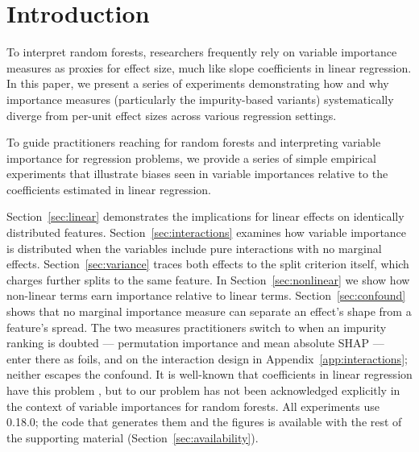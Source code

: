 \section{Introduction}
\label{sec:background-strands}

To interpret random forests, researchers frequently rely on variable
importance measures as proxies for effect size, much like slope
coefficients in linear regression.
In this paper, we present a series of experiments demonstrating
how and why importance measures (particularly the impurity-based variants)
systematically diverge from per-unit
effect sizes across various regression settings.

To guide practitioners reaching for
random forests and interpreting variable importance for regression
problems, we provide a series of simple empirical experiments that
illustrate biases seen in variable importances 
relative to the coefficients estimated in linear regression.

Section~\ref{sec:linear} demonstrates the implications for linear effects on
identically distributed
features. Section~\ref{sec:interactions} examines how variable importance is
distributed
when the variables include pure interactions with no marginal effects.
Section~\ref{sec:variance} traces both effects to the split criterion itself,
which charges further splits to the same feature.
In Section~\ref{sec:nonlinear} we show how non-linear terms earn importance
relative to linear terms.
Section~\ref{sec:confound} shows that no marginal importance measure can
separate an effect's shape from a feature's spread. The two measures
practitioners switch to when an impurity ranking is doubted --- permutation
importance and mean absolute SHAP --- enter there as foils, and on the
interaction design in Appendix~\ref{app:interactions}; neither escapes the
confound.
It is well-known that coefficients in linear regression have this problem \cite{bring1994}, 
but to our problem has not been acknowledged explicitly in the context of variable
importances for random forests.
All experiments use  0.18.0; the code that generates them and the
figures is available with the rest of the supporting material
(Section~\ref{sec:availability}).

